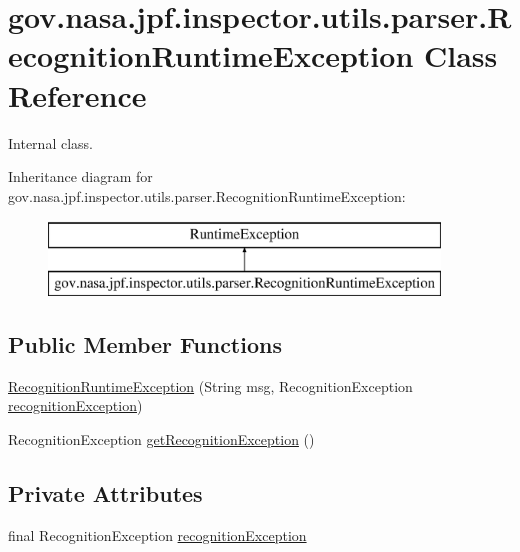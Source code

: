 \hypertarget{classgov_1_1nasa_1_1jpf_1_1inspector_1_1utils_1_1parser_1_1_recognition_runtime_exception}{}\section{gov.\+nasa.\+jpf.\+inspector.\+utils.\+parser.\+Recognition\+Runtime\+Exception Class Reference}
\label{classgov_1_1nasa_1_1jpf_1_1inspector_1_1utils_1_1parser_1_1_recognition_runtime_exception}


Internal class.  


Inheritance diagram for gov.\+nasa.\+jpf.\+inspector.\+utils.\+parser.\+Recognition\+Runtime\+Exception\+:\begin{figure}[H]
\begin{center}
\leavevmode
\includegraphics[height=2.000000cm]{classgov_1_1nasa_1_1jpf_1_1inspector_1_1utils_1_1parser_1_1_recognition_runtime_exception}
\end{center}
\end{figure}
\subsection*{Public Member Functions}
\begin{DoxyCompactItemize}
\item 
\hyperlink{classgov_1_1nasa_1_1jpf_1_1inspector_1_1utils_1_1parser_1_1_recognition_runtime_exception_aac17c51233ae945539eac260b9706ca0}{Recognition\+Runtime\+Exception} (String msg, Recognition\+Exception \hyperlink{classgov_1_1nasa_1_1jpf_1_1inspector_1_1utils_1_1parser_1_1_recognition_runtime_exception_a30990dd485ffc99538479766c9abb40d}{recognition\+Exception})
\item 
Recognition\+Exception \hyperlink{classgov_1_1nasa_1_1jpf_1_1inspector_1_1utils_1_1parser_1_1_recognition_runtime_exception_a164139cd1798dc16e4465c1d88ba29a5}{get\+Recognition\+Exception} ()
\end{DoxyCompactItemize}
\subsection*{Private Attributes}
\begin{DoxyCompactItemize}
\item 
final Recognition\+Exception \hyperlink{classgov_1_1nasa_1_1jpf_1_1inspector_1_1utils_1_1parser_1_1_recognition_runtime_exception_a30990dd485ffc99538479766c9abb40d}{recognition\+Exception}
\end{DoxyCompactItemize}
